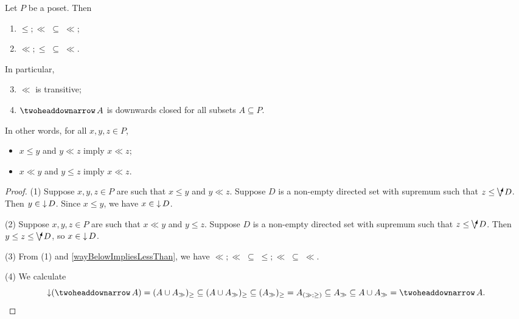 \begin{lemma} \label{wayBelowAbsorbsLessThan}
Let $P$ be a poset. Then
\begin{enumerate}
\item $\leq;\ll \;\subseteq\; \ll$;
\item $\ll;\leq \;\subseteq\; \ll$.
\end{enumerate}
In particular,
\begin{enumerate} \setcounter{enumi}{2}
\item $\ll$ is transitive;
\item $\ddownset A$ is downwards closed for all subsets $A\subseteq P$.
\end{enumerate}
\end{lemma}
In other words, for all $x,y,z\in P$,
\begin{itemize}
\item $x\leq y$ and $y\ll z$ imply $x\ll z$;
\item $x\ll y$ and $y\leq z$ imply $x\ll z$.
\end{itemize} 
\begin{proof}
(1) Suppose $x,y,z\in P$ are such that $x\leq y$ and $y\ll z$. Suppose $D$ is a non-empty directed set with supremum such that $z\leq \dirvee D$. Then $y\in \operatorname{\downarrow} D$. Since $x\leq y$, we have $x\in \operatorname{\downarrow} D$.

(2) Suppose $x,y,z\in P$ are such that $x\ll y$ and $y\leq z$. Suppose $D$ is a non-empty directed set with supremum such that $z\leq \dirvee D$. Then $y \leq z\leq \dirvee D$, so $x\in \operatorname{\downarrow} D$.

(3) From (1) and \ref{wayBelowImpliesLessThan}, we have $\ll;\ll \;\subseteq\; \leq;\ll \;\subseteq\; \ll$.

(4) We calculate
\[ \downset(\ddownset A) = (A \cup A_\gg)_{\geq} \subseteq (A \cup A_\gg)_{\geq} \subseteq (A_{\gg})_\geq = A_{(\gg;\geq)} \subseteq A_\gg \subseteq A\cup A_\gg = \ddownset A. \]
\end{proof}

